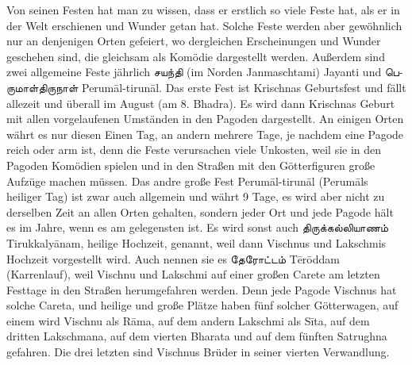 \documentclass{article}
\newcommand{\TamilText}[1]{\texttamil{#1}}
\newcommand{\tam}[1]{\TamilText{#1}}
\begin{document}
Von seinen Festen hat man zu wissen, dass er erstlich so viele Feste hat, als er in der Welt erschienen und Wunder getan hat. Solche Feste werden aber gewöhnlich nur an denjenigen Orten gefeiert, wo dergleichen Erscheinungen und Wunder geschehen sind, die gleichsam als Komödie dargestellt werden. Außerdem sind zwei allgemeine Feste jährlich \tam{சயந்தி} (im Norden Janmaschtami) Jayanti und \tam{பெருமாள்திருநாள்} Perum\={a}l-tirun\={a}l. Das erste Fest ist Krischnas Geburtsfest und fällt allezeit und überall im August (am 8. Bhadra). Es wird dann Krischnas Geburt mit allen vorgelaufenen Umständen in den Pagoden dargestellt. An einigen Orten währt es nur diesen Einen Tag, an andern mehrere Tage, je nachdem eine Pagode reich oder arm ist, denn die Feste verursachen viele Unkosten, weil sie in den Pagoden Komödien spielen und in den Straßen mit den Götterfiguren große Aufzüge machen müssen. Das andre große Fest Perum\={a}l-tirun\={a}l (Perum\={a}ls heiliger Tag) ist zwar auch allgemein und währt 9 Tage, es wird aber nicht zu derselben Zeit an allen Orten gehalten, sondern jeder Ort und jede Pagode hält es im Jahre, wenn es am gelegensten ist. Es wird sonst auch \tam{திருக்கல்லியாணம்} Tirukkaly\={a}nam, heilige Hochzeit, genannt, weil dann Vischnus und Lakschmis Hochzeit vorgestellt wird. Auch nennen sie es \tam{தேரோட்டம்} T\={e}r\={o}ddam (Karrenlauf), weil Vischnu und Lakschmi auf einer großen Carete am letzten Festtage in den Straßen herumgefahren werden. Denn jede Pagode Vischnus hat solche Careta, und heilige und große Plätze haben fünf solcher Götterwagen, auf einem wird Vischnu als R\={a}ma, auf dem andern Lakschmi als S\={i}ta, auf dem dritten Lakschmana, auf dem vierten Bharata und auf dem fünften Satrughna gefahren. Die drei letzten sind Vischnus Brüder in seiner vierten Verwandlung.
\end{document}
